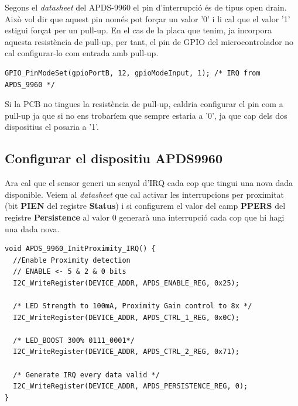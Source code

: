 Segons el {\em datasheet} \cite[3]{apds9960} del APDS-9960 el pin d'interrupció és de tipus \gls{open drain}. Això vol dir que aquest pin només pot forçar un valor '0' i li cal que el valor '1' estigui forçat per un \gls{pull-up}. En el cas de la placa que tenim, ja incorpora aquesta resistència de \gls{pull-up}, per tant, el pin de GPIO del microcontrolador no cal configurar-lo com entrada amb \gls{pull-up}.
\begin{lstlisting}[style=customc]
GPIO_PinModeSet(gpioPortB, 12, gpioModeInput, 1); /* IRQ from APDS_9960 */
\end{lstlisting}

Si la PCB no tingues la resistència de \gls{pull-up}, caldria configurar el pin com a \gls{pull-up} ja que si no ens trobaríem que sempre estaria a '0', ja que cap dels dos dispositius el posaria a '1'.

\subsection{Configurar el dispositiu APDS{\-}9960}
Ara cal que el sensor generi un senyal d'\gls{IRQ} cada cop que tingui una nova dada disponible.
Veiem al {\em datasheet} \cite[11 i 20]{apds9960} que cal activar les interrupcions per proximitat (bit {\bf PIEN} del registre {\bf Status}) i si configurem el valor del camp {\bf PPERS} del registre {\bf Persistence} al valor 0 generarà una interrupció cada cop que hi hagi una dada nova.

\begin{lstlisting}[caption={Nova funció d'initialització del APDS{\_}9960},style=customc,label=APDS960InitProximityIRQ]
void APDS_9960_InitProximity_IRQ() {
  //Enable Proximity detection
  // ENABLE <- 5 & 2 & 0 bits
  I2C_WriteRegister(DEVICE_ADDR, APDS_ENABLE_REG, 0x25);

  /* LED Strength to 100mA, Proximity Gain control to 8x */
  I2C_WriteRegister(DEVICE_ADDR, APDS_CTRL_1_REG, 0x0C);

  /* LED_BOOST 300% 0111_0001*/
  I2C_WriteRegister(DEVICE_ADDR, APDS_CTRL_2_REG, 0x71);

  /* Generate IRQ every data valid */
  I2C_WriteRegister(DEVICE_ADDR, APDS_PERSISTENCE_REG, 0);
}
\end{lstlisting}

